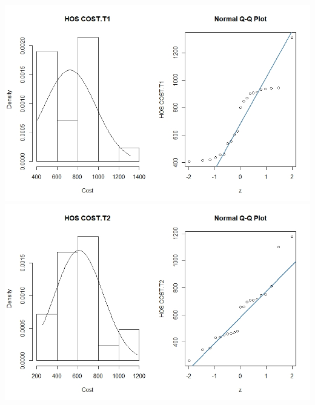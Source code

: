 \documentclass[11pt]{article}
\begin{document}
\includegraphics[width=15cm]{RStudio/jpeg/Norm HOS T1.jpeg}
\includegraphics[width=15cm]{RStudio/jpeg/Norm HOS T2.jpeg}
\end{document}
